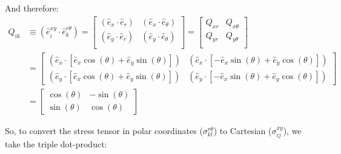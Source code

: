 And therefore: 
\begin{align}
	Q_{ik} &\equiv (\hat{e}_{i}^{xy} \cdot \hat{e}_k^{r \theta}) =
	\begin{bmatrix}
		(\hat{e}_{x} \cdot \hat{e}_{r}) & (\hat{e}_{x} \cdot \hat{e}_{\theta})\\
		(\hat{e}_{y} \cdot \hat{e}_{r}) & (\hat{e}_{y} \cdot \hat{e}_{\theta})\\
	\end{bmatrix}
	=
	\begin{bmatrix}
		Q_{xr} & Q_{x\theta}\\
		Q_{yr} & Q_{y\theta}\\
	\end{bmatrix} \\
	&=
		\begin{bmatrix}
		\left(\hat{e}_{x} \cdot \left[\hat{e}_{x} \cos(\theta) + \hat{e}_{y} \sin(\theta)\right]\right) & \left(\hat{e}_{x} \cdot \left[-\hat{e}_{x} \sin(\theta) + \hat{e}_{y} \cos(\theta)\right]\right)\\
		\left(\hat{e}_{y} \cdot \left[\hat{e}_{x} \cos(\theta) + \hat{e}_{y} \sin(\theta)\right]\right) & \left(\hat{e}_{y} \cdot \left[-\hat{e}_{x} \sin(\theta) + \hat{e}_{y} \cos(\theta)\right]\right)	
		\end{bmatrix}\\
		&=
		\begin{bmatrix}
		\cos(\theta) & -\sin(\theta)\\
		\sin(\theta) & \cos(\theta)	
		\end{bmatrix}
\end{align}

So, to convert the stress tensor in polar coordinates ($\sigma_{kl}^{r\theta}$) to Cartesian ($\sigma_{ij}^{xy}$), we take the triple dot-product:

